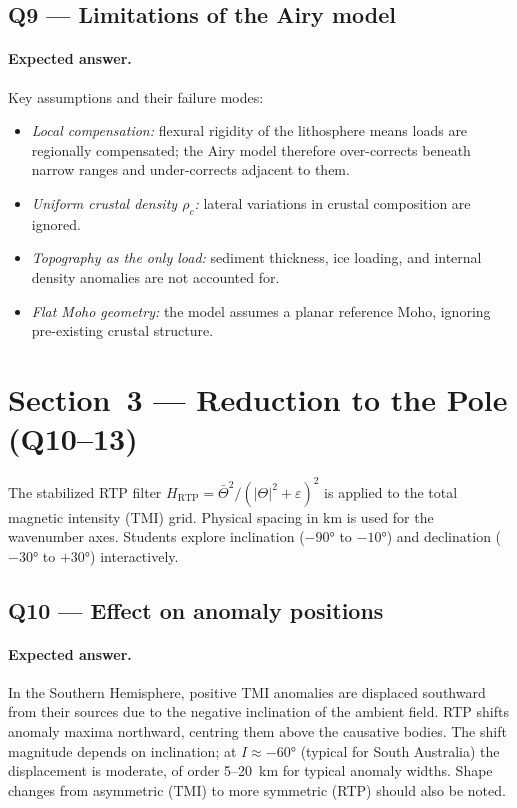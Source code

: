 \documentclass[11pt]{article}
\begin{document}
\subsection*{Q9 — Limitations of the Airy model}

\paragraph{Expected answer.}
Key assumptions and their failure modes:
\begin{itemize}
  \item \emph{Local compensation:} flexural rigidity of the lithosphere means
        loads are regionally compensated; the Airy model therefore over-corrects
        beneath narrow ranges and under-corrects adjacent to them.
  \item \emph{Uniform crustal density $\rho_c$:} lateral variations in crustal
        composition are ignored.
  \item \emph{Topography as the only load:} sediment thickness, ice loading, and
        internal density anomalies are not accounted for.
  \item \emph{Flat Moho geometry:} the model assumes a planar reference Moho,
        ignoring pre-existing crustal structure.
\end{itemize}

\section{Section~3 — Reduction to the Pole (Q10--13)}

The stabilized RTP filter
$H_\mathrm{RTP} = \bar{\Theta}^2 / (|\Theta|^2 + \varepsilon)^2$
is applied to the total magnetic intensity (TMI) grid.  Physical spacing in km
is used for the wavenumber axes.  Students explore inclination ($-90°$ to $-10°$)
and declination ($-30°$ to $+30°$) interactively.

\subsection*{Q10 — Effect on anomaly positions}

\paragraph{Expected answer.}
In the Southern Hemisphere, positive TMI anomalies are displaced southward from
their sources due to the negative inclination of the ambient field.  RTP shifts
anomaly maxima northward, centring them above the causative bodies.  The shift
magnitude depends on inclination; at $I \approx -60°$ (typical for South
Australia) the displacement is moderate, of order 5--20~km for typical anomaly
widths.  Shape changes from asymmetric (TMI) to more symmetric (RTP) should also
be noted.
\end{document}
